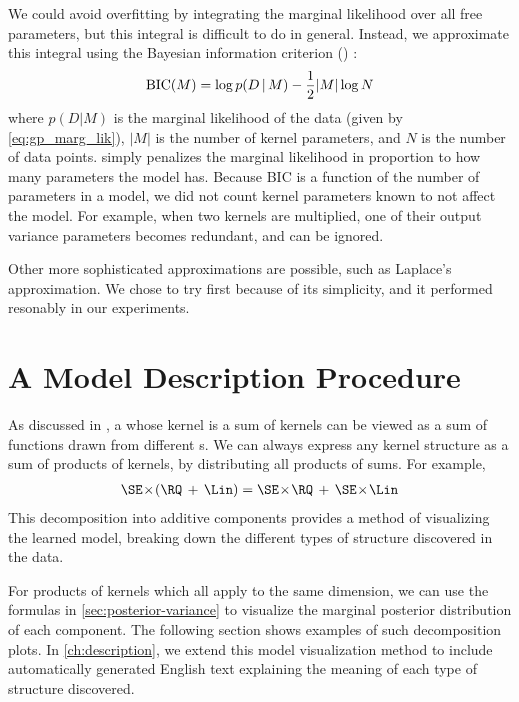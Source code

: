 We could avoid overfitting by integrating the marginal likelihood over all free parameters, but this integral is difficult to do in general.
Instead, we approximate this integral using the Bayesian information criterion (\BIC{}) \citep{schwarz1978estimating}:
%
\begin{equation}
\textrm{BIC}(M) = \log p(D \,|\, M) - \frac{1}{2} |M| \log N
\end{equation}
%
where $p(D|M)$ is the marginal likelihood of the data (given by \cref{eq:gp_marg_lik}), $|M|$ is the number of kernel parameters, and $N$ is the number of data points.
\BIC{} simply penalizes the marginal likelihood in proportion to how many parameters the model has.
Because BIC is a function of the number of parameters in a model, we did not count kernel parameters known to not affect the model.
For example, when two kernels are multiplied, one of their output variance parameters becomes redundant, and can be ignored.

Other more sophisticated approximations are possible, such as Laplace's approximation.
We chose to try \BIC{} first because of its simplicity, and it performed resonably in our experiments.




\section{A Model Description Procedure}

As discussed in , a \gp{} whose kernel is a sum of kernels can be viewed as a sum of functions drawn from different \gp{}s.
We can always express any kernel structure as a sum of products of kernels, by distributing all products of sums.
For example,
%
\begin{align}
\SE \kerntimes (\RQ \kernplus \Lin) = \SE \kerntimes  \RQ \kernplus \SE \kerntimes \Lin
\end{align}
%
This decomposition into additive components provides a method of visualizing the learned model, breaking down the different types of structure discovered in the data.

For products of kernels which all apply to the same dimension, we can use the formulas in \cref{sec:posterior-variance} to visualize the marginal posterior distribution of each component.
The following section shows examples of such decomposition plots.
In \cref{ch:description}, we extend this model visualization method to include automatically generated English text explaining the meaning of each type of structure discovered.




